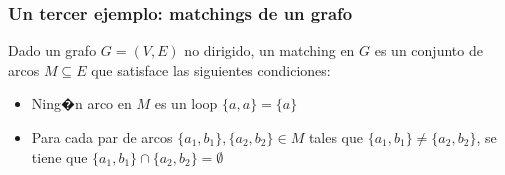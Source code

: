 \documentclass{beamer}
\newcommand{\vs}[1]{\vspace{#1mm}}
\begin{document}
	
	
	
	
	\begin{frame}
		\frametitle{Un tercer ejemplo: matchings de un grafo}
		
		{\small
			Dado un grafo $G=(V,E)$ no dirigido, un matching en $G$ es un conjunto de arcos $M \subseteq E$ que satisface las siguientes condiciones:
			\begin{itemize}
				\item Ning�n arco en $M$ es un loop $\{a,a\} = \{a\}$
				
				\item Para cada par de arcos $\{a_1,b_1\}, \{a_2, b_2\} \in M$ tales que $\{a_1,b_1\} \neq \{a_2,b_2\}$, se tiene que $\{a_1,b_1\} \cap \{a_2,b_2\} = \emptyset$
			\end{itemize}
			
		}
	\end{frame}
	
\end{document}
